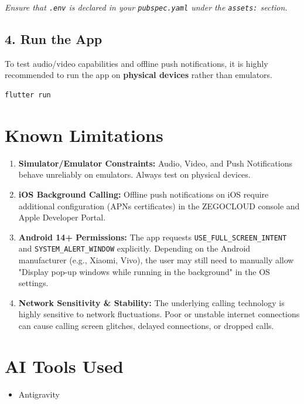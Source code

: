 \documentclass[11pt,a4paper]{article}
\begin{document}
\textit{Ensure that \texttt{.env} is declared in your \texttt{pubspec.yaml} under the \texttt{assets:} section.}

\subsection*{4. Run the App}
To test audio/video capabilities and offline push notifications, it is highly recommended to run the app on \textbf{physical devices} rather than emulators.

\begin{verbatim}
flutter run
\end{verbatim}

\section*{Known Limitations}
\begin{enumerate}
    \item \textbf{Simulator/Emulator Constraints:} Audio, Video, and Push Notifications behave unreliably on emulators. Always test on physical devices.
    \item \textbf{iOS Background Calling:} Offline push notifications on iOS require additional configuration (APNs certificates) in the ZEGOCLOUD console and Apple Developer Portal.
    \item \textbf{Android 14+ Permissions:} The app requests \texttt{USE\_FULL\_SCREEN\_INTENT} and \texttt{SYSTEM\_ALERT\_WINDOW} explicitly. Depending on the Android manufacturer (e.g., Xiaomi, Vivo), the user may still need to manually allow "Display pop-up windows while running in the background" in the OS settings.
    \item \textbf{Network Sensitivity \& Stability:} The underlying calling technology is highly sensitive to network fluctuations. Poor or unstable internet connections can cause calling screen glitches, delayed connections, or dropped calls.
\end{enumerate}

\section*{AI Tools Used}
\begin{itemize}
    \item Antigravity
\end{itemize}
\end{document}

